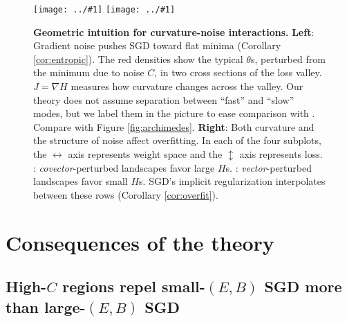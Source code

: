 \documentclass[final,12pt]{colt2021} %
\newcommand{\offive}[1]{
    {\tiny
        \raisebox{-0.04cm}{\color{gray}\scalebox{2.5}{$\substack{
            \ifthenelse{\equal{#1}{0}}{{\color{moor}\blacksquare}}{\square} 
        }$}}%
        \raisebox{0.04cm}{$\substack{
            \IfSubStr{#1}{1}{{\color{moor}\blacksquare}}{\square}   
            \IfSubStr{#1}{1}{{\color{moor}\blacksquare}}{\square} \\
            \IfSubStr{#1}{2}{{\color{moor}\blacksquare}}{\square}    
            \IfSubStr{#1}{2}{{\color{moor}\blacksquare}}{\square}    
        }$}%
    }%
}
\newcommand{\plotmooh}[3]{\texttt{[image: ../\#1]}}
\begin{document}
            \begin{figure}[h!]
                \centering
                \plotmooh{diagrams/entropic-force-diagram}{}{0.32\columnwidth} 
                \plotmooh{diagrams/sharp}{}{0.31\columnwidth}
                \caption{%
                    \textbf{Geometric intuition for curvature-noise interactions.}
                    \textbf{Left}:
                        Gradient noise pushes SGD toward flat minima
                        (Corollary
                        \ref{cor:entropic}).  The red densities show the 
                        typical $\theta$s, perturbed from the
                        minimum due to noise $C$, in two cross sections of the
                        loss valley.  $J = \nabla H$ measures
                        how curvature changes across the valley.  Our theory
                        does not assume separation between ``fast'' and
                        ``slow'' modes, but we label them in the picture to
                        ease comparison with \cite{we19b}.
                        Compare with Figure \ref{fig:archimedes}.
                    \textbf{\bf Right}:
                        Both curvature and the structure of noise affect
                        overfitting.  In each of the four subplots, the  
                        $\leftrightarrow$ axis represents weight space and the
                        $\updownarrow$ axis represents loss.
                        \protect\offive{1}:
                        \emph{covector}-perturbed landscapes favor large $H$s.
                        \protect\offive{2}:
                        \emph{vector}-perturbed landscapes favor small $H$s.
                        SGD's implicit regularization interpolates between
                        these rows (Corollary \ref{cor:overfit}).
                }
                \label{fig:cubicandspring}
            \end{figure}
    

    \section{Consequences of the theory}

        \subsection{High-$C$ regions repel small-$(E,B)$ SGD more than large-$(E,B)$ SGD}
            \label{subsect:epochs-batch}
\end{document}
